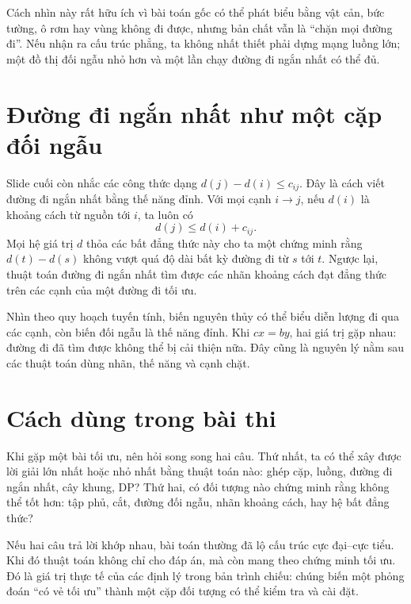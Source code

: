 \documentclass[11pt]{article}
\begin{document}
Cách nhìn này rất hữu ích vì bài toán gốc có thể phát biểu bằng vật cản, bức
tường, ô rơm hay vùng không đi được, nhưng bản chất vẫn là ``chặn mọi đường
đi''. Nếu nhận ra cấu trúc phẳng, ta không nhất thiết phải dựng mạng luồng
lớn; một đồ thị đối ngẫu nhỏ hơn và một lần chạy đường đi ngắn nhất có thể đủ.

\section{Đường đi ngắn nhất như một cặp đối ngẫu}

Slide cuối còn nhắc các công thức dạng \(d(j)-d(i)\le c_{ij}\). Đây là cách
viết đường đi ngắn nhất bằng thế năng đỉnh. Với mọi cạnh \(i\to j\), nếu
\(d(i)\) là khoảng cách từ nguồn tới \(i\), ta luôn có
\[
  d(j)\le d(i)+c_{ij}.
\]
Mọi hệ giá trị \(d\) thỏa các bất đẳng thức này cho ta một chứng minh rằng
\(d(t)-d(s)\) không vượt quá độ dài bất kỳ đường đi từ \(s\) tới \(t\). Ngược
lại, thuật toán đường đi ngắn nhất tìm được các nhãn khoảng cách đạt đẳng thức
trên các cạnh của một đường đi tối ưu.

Nhìn theo quy hoạch tuyến tính, biến nguyên thủy có thể biểu diễn lượng đi
qua các cạnh, còn biến đối ngẫu là thế năng đỉnh. Khi \(c x=b y\), hai giá
trị gặp nhau: đường đi đã tìm được không thể bị cải thiện nữa. Đây cũng là
nguyên lý nằm sau các thuật toán dùng nhãn, thế năng và cạnh chặt.

\section{Cách dùng trong bài thi}

Khi gặp một bài tối ưu, nên hỏi song song hai câu. Thứ nhất, ta có thể xây
được lời giải lớn nhất hoặc nhỏ nhất bằng thuật toán nào: ghép cặp, luồng,
đường đi ngắn nhất, cây khung, DP? Thứ hai, có đối tượng nào chứng minh rằng
không thể tốt hơn: tập phủ, cắt, đường đối ngẫu, nhãn khoảng cách, hay hệ bất
đẳng thức?

Nếu hai câu trả lời khớp nhau, bài toán thường đã lộ cấu trúc cực đại--cực
tiểu. Khi đó thuật toán không chỉ cho đáp án, mà còn mang theo chứng minh tối
ưu. Đó là giá trị thực tế của các định lý trong bản trình chiếu: chúng biến
một phỏng đoán ``có vẻ tối ưu'' thành một cặp đối tượng có thể kiểm tra và
cài đặt.
\end{document}
